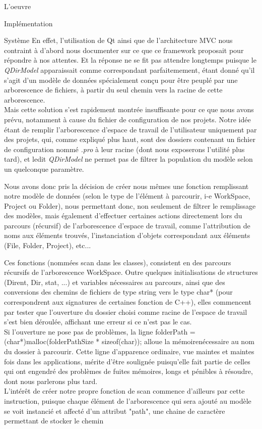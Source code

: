 \documentclass[a4paper, 12pt]{report}
\begin{document}
\begin{part}{L'oeuvre}
\begin{chapter}{Implémentation}
\begin{section}{Système}
				En effet, l'utilisation de \gls{Qt} ainsi que de l'architecture MVC nous contraint à d'abord nous documenter sur ce que ce 
				framework proposait pour répondre à nos attentes. Et la réponse ne se fit pas attendre longtemps puisque le \emph{QDirModel} 
				apparaissait comme correspondant parfaitemement, étant donné qu'il s'agit d'un modèle de données spécialement conçu pour être
				peuplé par une arborescence de fichiers, à partir du seul chemin vers la racine de cette arborescence.\\


				Mais cette solution s'est rapidement montrée insuffisante pour ce que nous avons prévu, notamment à cause du fichier de 
				configuration de nos projets. Notre idée étant de remplir l'arborescence d'espace de travail de l'utilisateur uniquement par des
				projets, qui, comme expliqué plus haut, sont des dossiers contenant un fichier de configuration nommé \emph{.pro} à leur racine (dont 
				nous exposerons l'utilité plus tard), et ledit \emph{QDirModel} ne permet pas de filtrer la population du modèle selon un quelconque
				paramètre.

				Nous avons donc pris la décision de créer nous mêmes une fonction remplissant notre modèle de données (selon le type de l'élément à parcourir, i-e WorkSpace, Project ou Folder), nous permettant donc, non seulement de filtrer le remplissage des modèles, mais également d'effectuer certaines actions directement lors du parcours (récursif) de l'arborescence d'espace de travail, comme l'attribution de noms aux éléments trouvés, l'instanciation d'objets correspondant aux éléments (File, Folder, Project), etc...

				Ces fonctions (nommées scan dans les classes), consistent en des parcours récursifs de l'arborescence WorkSpace. Outre quelques initialisations de structures (Dirent, Dir, stat, ...) et variables nécessaires au parcours, ainsi que des conversions des chemins de fichiers de type string vers le type char* (pour correspondrent aux signatures de certaines fonction de C++), elles commencent par tester que l'ouverture du dossier choisi comme racine de l'espace de travail s'est bien déroulée, affichant une erreur si ce n'est pas le cas.\\
				Si l'ouverture ne pose pas de problèmes, la ligne folderPath = (char*)malloc(folderPathSize * sizeof(char));
				alloue la mémoirenécessaire au nom du dossier à parcourir. 
				Cette ligne d'apparence ordinaire, vue maintes et maintes fois dans les applications, mérite d'être soulignée puisqu'elle fait partie de celles qui ont engendré des problèmes de fuites mémoires, longs et pénibles
				à résoudre, dont nous parlerons plus tard.\\
				L'intérêt de créer notre propre fonction de scan commence d'ailleurs par cette instruction, puisque chaque élément de l'arborescence qui sera ajouté au modèle se voit instancié et affecté d'un attribut "path", une chaine de caractère permettant de stocker le chemin


\end{section}
\end{chapter}
\end{part}
\end{document}
